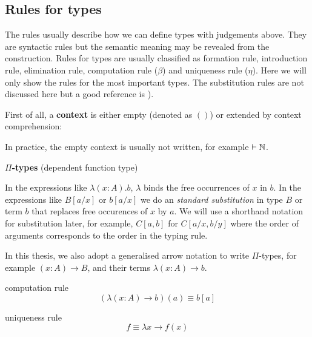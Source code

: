 \subsection{Rules for types}\label{typerule}


The rules usually describe how we can define types with judgements above. They are syntactic rules but the semantic meaning may be revealed from the construction.
Rules for types are usually classified as formation rule, introduction rule, elimination rule, computation rule ($\beta$) and uniqueness rule ($\eta$). Here we will only show the rules for the most important types. The substitution rules are not discussed here but a good reference is \cite{hof:phd}).


First of all, a \textbf{context} is either empty (denoted as $()$) or extended by context comprehension:


In practice, the empty context is usually not written, for example $\vdash \mathbb{N}$.

\textbf{$\Pi$-types} (dependent function type)

\begin{multicols}{2}
\columnbreak
{}
\end{multicols}


In the expressions like $\lambda (x:A).b$, $\lambda$ binds the free occurrences of $x$ in $b$.
In the expressions like $B[a/x]$ or $b[a/x]$ we do an \emph{standard substitution} in type $B$ or term $b$ that replaces free occurences of $x$ by $a$. We will use a shorthand notation for substitution later, for example, $C[a,b]$ for $C[a/x,b/y]$ where the order of arguments corresponds to the order in the typing rule.

In this thesis, we also adopt a generalised arrow notation to write $\Pi$-types, for example $(x : A) \to B$, and their terms $\lambda (x: A) \to b$.

\begin{multicols}{2}
computation rule
$$(\lambda (x:A) \to b)(a) \equiv b[a]$$

\columnbreak

uniqueness rule
$$f \equiv \lambda x \to f(x) $$
\end{multicols}

